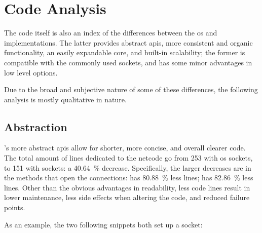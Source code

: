 \chapter{Code Analysis}\label{ch:code}

The code itself is also an index of the differences between the \gls{os} and  implementations. The latter provides abstract \glspl{api}, more consistent and organic functionality, an easily expandable core, and built-in scalability; the former is compatible with the commonly used  sockets, and has some minor advantages in low level options.

Due to the broad and subjective nature of some of these differences, the following analysis is mostly qualitative in nature.

\section{Abstraction}\label{sc:code:abstraction}

's more abstract \glspl{api} allow for shorter, more concise, and overall clearer code. The total amount of lines dedicated to the \gls{netcode} go from \num{253} with \gls{os} sockets, to \num{151} with  sockets: a \SI{40,64}{\percent} decrease. Specifically, the larger decreases are in the methods that open the connections:  has \SI{80,88}{\percent} less lines;  has \SI{82,86}{\percent} less lines. Other than the obvious advantages in readability, less code lines result in lower maintenance, less side effects when altering the code, and reduced failure points.



As an example, the two following snippets both set up a socket:

